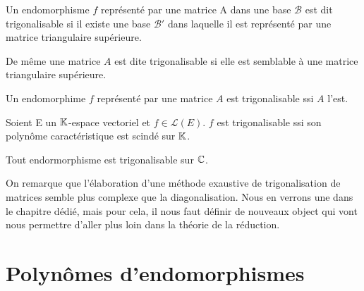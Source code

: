 
\begin{definition}[Trigonalisation]
    Un endomorphisme $f$ représenté par une matrice A dans une base $\mathcal{B}$ est dit trigonalisable si 
    il existe une base $\mathcal{B}'$ dans laquelle il est représenté par une matrice triangulaire supérieure. 

    \vspace{0.3cm}

    De même une matrice $A$ est dite trigonalisable si elle est semblable à une matrice triangulaire supérieure. 
\end{definition}

\begin{proposition}
    Un endomorphime $f$ représenté par une matrice $A$ est trigonalisable ssi $A$ l'est. 
\end{proposition}


\begin{criteria}
    Soient E un $\mathbb{K}$-espace vectoriel et $f \in \mathcal{L}(E)$. $f$ est trigonalisable ssi son polynôme caractéristique est scindé sur $\mathbb{K}$. 
\end{criteria}

\begin{corollary}[La puissance de $\C$]
    Tout endormorphisme est trigonalisable sur $\C$. 
\end{corollary}

On remarque que l'élaboration d'une méthode exaustive de trigonalisation de matrices semble plus complexe que la diagonalisation. 
Nous en verrons une dans le chapitre dédié, mais pour cela, il nous faut définir de nouveaux object qui vont nous permettre d'aller plus loin dans la théorie de la réduction. 


\section{Polynômes d'endomorphismes}


